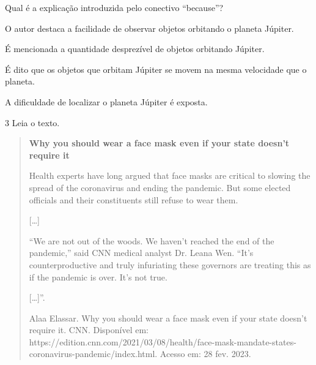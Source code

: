 Qual é a explicação introduzida pelo conectivo ``because''?

\begin{escolha}
\item O autor destaca a facilidade de observar objetos orbitando o planeta
Júpiter.

\item É mencionada a quantidade desprezível de objetos orbitando Júpiter.

\item É dito que os objetos que orbitam Júpiter se movem na mesma
velocidade que o planeta.

\item A dificuldade de localizar o planeta Júpiter é exposta.
\end{escolha}


\num{3} Leia o texto.


\begin{quote}
\textbf{Why you should wear a face mask even if your state doesn't
require it}

Health experts have long argued that face masks are critical to slowing
the spread of the coronavirus and ending the pandemic. But some elected
officials and their constituents still refuse to wear them.

{[}\ldots{}{]}

``We are not out of the woods. We haven't reached the end of the
pandemic,'' said CNN medical analyst Dr. Leana Wen. ``It's
counterproductive and truly infuriating these governors are treating
this as if the pandemic is over. It's not true.

{[}\ldots{}{]}''.

Alaa Elassar. Why you should wear a face mask even if your state doesn't
require it. CNN. Disponível em:
https://edition.cnn.com/2021/03/08/health/face-mask-mandate-states-coronavirus-pandemic/index.html.
Acesso em: 28 fev. 2023.
\end{quote}

